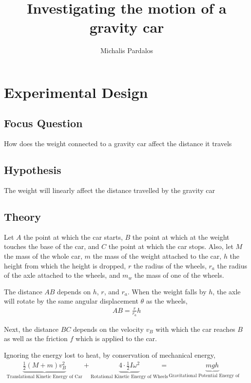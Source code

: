 \documentclass[titlepage,12pt]{article}
\title{Investigating the motion of a gravity car}
\author{Michalis Pardalos}
\date{}
\begin{document}
\maketitle
\section{Experimental Design}

    \subsection{Focus Question}
        How does the weight connected to a gravity car affect the distance it
        travels

    \subsection{Hypothesis}
        The weight will linearly affect the distance travelled by the gravity
        car

    \subsection{Theory}
        Let $A$ the point at which the car starts, $B$ the point at which at the weight
        touches the base of the car, and $C$ the point at which the car stops. Also, let $M$
        the mass of the whole car, $m$ the mass of the weight attached to the car, $h$ the
        height from which the height is dropped, $r$ the radius of the wheels, $r_a$ the
        radius of the axle attached to the wheels, and $m_w$ the mass of one of the wheels.

        The distance $AB$ depends on $h$, $r$, and $r_a$. When the weight falls by $h$, the
        axle will rotate by the same angular displacement $\theta$ as the wheels, 
        \begin{align*}
            AB = \frac{r}{r_a} h
        \end{align*}

        Next, the distance $BC$ depends on the velocity $v_B$ with which the car reaches
        $B$ as well as the friction $f$ which is applied to the car. 

        Ignoring the energy lost to heat, by conservation of mechanical energy,
        \begin{align*}
            \underbrace{\frac{1}{2}(M+m)v_B^2}_{\text{Translational Kinetic Energy of Car}} +
            \underbrace{4\cdot\frac{1}{2}I\omega^2}_{\text{Rotational Kinetic Energy of Wheels}} &=
            \underbrace{mgh}_{\text{Gravitational Potential Energy of Weight}}
        \end{align*}
\end{document}
